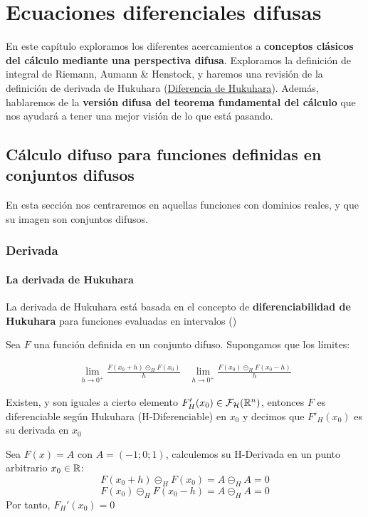 \chapter{Ecuaciones diferenciales difusas}
En este capítulo exploramos los diferentes acercamientos a \textbf{conceptos clásicos del cálculo mediante una perspectiva difusa}. Exploramos la definición de integral de Riemann, Aumann \& Henstock, y haremos una revisión de la definición de derivada de Hukuhara (\hyperref[def:hukukara]{Diferencia de Hukuhara}). Además, hablaremos de la \textbf{versión difusa del teorema fundamental del cálculo} que nos ayudará a tener una mejor visión de lo que está pasando.

\section{Cálculo difuso para funciones definidas en conjuntos difusos}
En esta sección nos centraremos en aquellas funciones con dominios reales, y que su imagen son conjuntos difusos.
\subsection{Derivada}

\subsubsection{La derivada de Hukuhara}
La derivada de Hukuhara está basada en el concepto de \textbf{diferenciabilidad de Hukuhara} para funciones evaluadas en intervalos (\cite{derivatehukuhara})

\begin{definicion}
	Sea $F$ una función definida en un conjunto difuso. Supongamos que los límites:
	
	\[
		\begin{array}{c||c}
			\lim\limits_{h \rightarrow 0^+} \frac{F(x_0 + h) \circleddash_H F(x_0)}{h} & \lim\limits_{h \rightarrow 0^+} \frac{F(x_0) \circleddash_H F(x_0 - h)}{h}
		\end{array}
	\]
	
	Existen, y son iguales a cierto elemento $F'_H(x_0) \in \mathcal{F}_\mathcal{H}(\mathbb R^n)$, entonces $F$ es diferenciable según Hukuhara (H-Diferenciable) en $x_0$ y decimos que $F'_H(x_0)$ es su derivada en $x_0$ 
\end{definicion}

\begin{ejemplo}
	Sea $F(x)=A$ con $A=(-1;0;1)$, calculemos su H-Derivada en un punto arbitrario $x_0 \in \mathbb R$: 
	\[
		F(x_0 + h) \circleddash_H F(x_0) = A \circleddash_H A = 0
	\]
	\[
		F(x_0) \circleddash_H F(x_0 - h) = A \circleddash_H A = 0
	\]
	Por tanto, $F_H'(x_0) = 0$
\end{ejemplo}

